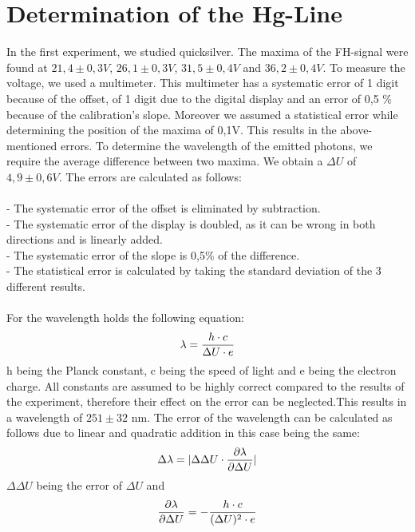 \documentclass[a4paper,11pt,twoside]{article}
\begin{document}
\section{Determination of the Hg-Line}
In the first experiment, we studied quicksilver. The maxima of the FH-signal were found at $21,4\pm0,3V$, $26,1\pm0,3V$, $31,5\pm0,4V$ and $36,2\pm0,4V$. To measure the voltage, we used a multimeter. This multimeter has a systematic error of 1 digit because of the offset, of 1 digit due to the digital display and an error of 0,5 \% because of the calibration's slope. Moreover we assumed a statistical error while determining the position of the maxima of 0,1V. This results in the above-mentioned errors.
To determine the wavelength of the emitted photons, we require the average difference between two maxima. We obtain a $\Delta U$ of $4,9\pm0,6V$. The errors are calculated as follows:\\\\
- The systematic error of the offset is eliminated by subtraction.\\
- The systematic error of the display is doubled, as it can be wrong in both directions and is linearly added.\\
- The systematic error of the slope is 0,5\% of the difference.\\
- The statistical error is calculated by taking the standard deviation of the 3 different results.\\\\
For the wavelength holds the following equation:
\begin{equation}
\lambda={h\cdot c \over \Delta U \cdot e}
\end{equation}
h being the Planck constant, c being the speed of light and e being the electron charge. All constants are assumed to be highly correct compared to the results of the experiment, therefore their effect on the error can be neglected.This results in a wavelength of $251\pm 32$ nm.
The error of the wavelength can be calculated as follows due to linear and quadratic addition in this case being the same:
\begin{equation}
\Delta \lambda=|\Delta \Delta U\cdot {\partial \lambda\over \partial \Delta U}|
\end{equation}
$\Delta\Delta U$ being the error of $\Delta U$ and 
\begin{equation}
{\partial \lambda\over \partial \Delta U}= -{h\cdot c\over (\Delta U)^2\cdot e}
\end{equation}
\end{document}

